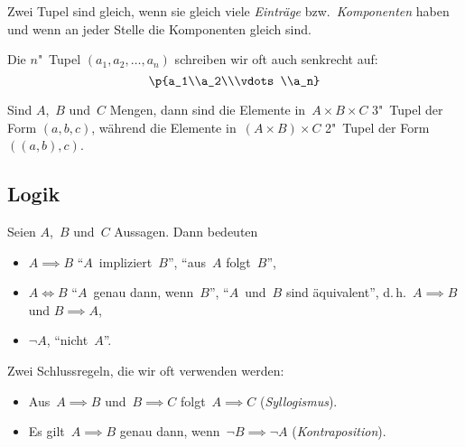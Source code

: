 \documentclass[a4paper]{article}
\begin{document}
\begin{remark}
    Zwei Tupel sind gleich, wenn sie gleich viele \emph{Einträge} bzw.\ \emph{Komponenten} haben und wenn an jeder Stelle die Komponenten gleich sind.
\end{remark}

\begin{notation}
    Die $n$"~Tupel $(a_1,a_2,\dots,a_n)$ schreiben wir oft auch senkrecht auf:
    \begin{equation*}
        \p{a_1\\a_2\\\vdots\\a_n}
    \end{equation*}
\end{notation}

\begin{example}
    Sind $A$,~$B$ und~$C$ Mengen, dann sind die Elemente in~$A \times B \times C$ 3"~Tupel der Form $(a, b, c)$, während die Elemente in~$(A \times B) \times C$ 2"~Tupel der Form $((a, b), c)$.
\end{example}

\subsection{Logik}

\begin{definition}
    Seien $A$,~$B$ und~$C$ Aussagen. Dann bedeuten
    \begin{itemize}
        \item $A \implies B$ "`$A$~impliziert~$B$"', "`aus~$A$ folgt~$B$"',
        \item $A \iff B$ "`$A$~genau dann, wenn~$B$"', "`$A$~und~$B$ sind äquivalent"', d.\,h.\ $A \implies B$ und $B \implies A$,
        \item $\neg A$, "`nicht~$A$"'.
    \end{itemize}
\end{definition}

Zwei Schlussregeln, die wir oft verwenden werden:

\begin{theorem}\label{thm:deductionrules}\leavevmode
    \begin{itemize}
        \item Aus~$A \implies B$ und~$B \implies C$ folgt~$A \implies C$ (\emph{Syllogismus}).
        \item Es gilt~$A \implies B$ genau dann, wenn~$\neg B \implies \neg A$ (\emph{Kontraposition}).
    \end{itemize}
\end{theorem}
\end{document}

